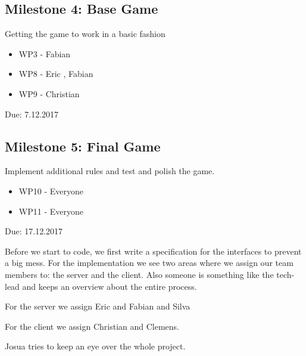 \documentclass{sig-alternate}
\begin{document}
\subsection{Milestone 4: Base Game}
Getting the game to work in a basic fashion
\begin{itemize}
	\item WP3 - Fabian
	\item WP8 - Eric , Fabian
	\item WP9 - Christian
\end{itemize}
Due: 7.12.2017

\subsection{Milestone 5: Final Game}
Implement additional rules and test and polish the game.
\begin{itemize}
	\item WP10 - Everyone
	\item WP11 - Everyone
\end{itemize}
Due: 17.12.2017

Before we start to code, we first write a specification for the interfaces to prevent a big mess. For the implementation we see two areas where we assign our team members to: the server and the client. Also someone is something like the tech-lead and keeps an overview about the entire process.

For the server we assign Eric and Fabian and Silva

For the client we assign Christian and Clemens.

Josua tries to keep an eye over the whole project.





\end{document}
